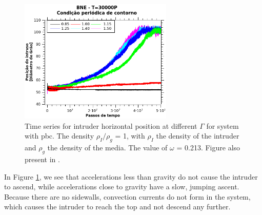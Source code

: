 \begin{figure}
    \centering
    \includegraphics[width=0.65\textwidth]{04-figuras/BNE30000Contorno.png}
    \caption[BNE with periodic boundary: time series.]{Time series for intruder horizontal position at different $\Gamma$ for system with pbc. The density $\rho_I/\rho_g$ = 1, with $\rho_I$ the density of the intruder and $\rho_g$ the density of the media. The value of $\omega$ = 0.213. Figure also present in \cite{Large-deviation_quantification_of_boundary_conditions_on_the_Brazil_nut_effect}.}
    \label{fig:BNE30000_Contorno}
\end{figure}


    In Figure \ref{fig:BNE30000_Contorno}, we see that accelerations less than gravity do not cause the intruder to ascend, while accelerations close to gravity have a slow, jumping ascent. Because there are no sidewalls, convection currents do not form in the system, which causes the intruder to reach the top and not descend any further. 

